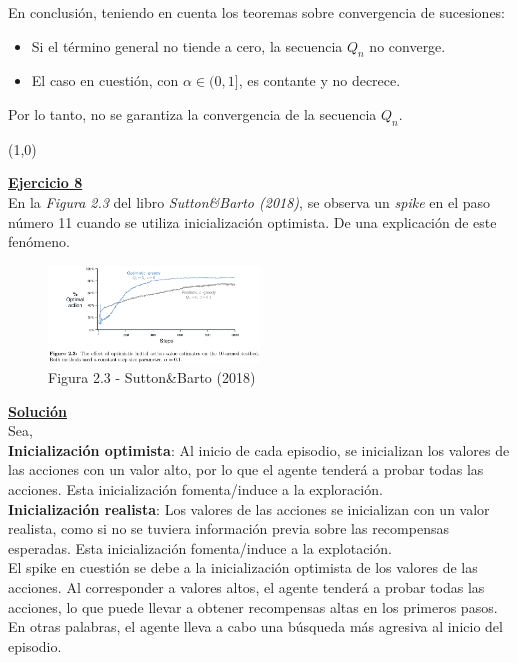 \documentclass[12pt]{article}
\newlength\tindent
\renewcommand{\indent}{\hspace*{\tindent}}
\begin{document}
\begin{itemize}
    En conclusión, teniendo en cuenta los teoremas sobre convergencia de sucesiones:

    \begin{itemize}
        \item Si el término general no tiende a cero, la secuencia $Q_n$ no converge.
        \item El caso en cuestión, con $\alpha \in (0,1]$, es contante y no decrece.
    \end{itemize}

    Por lo tanto, no se garantiza la convergencia de la secuencia $Q_n$.

    \line(1,0){\textwidth}

    \indent\underline{\textbf{Ejercicio 8}}\\
    En la \textit{Figura 2.3} del libro \textit{Sutton\&Barto (2018)}, se observa un \textit{spike} en el paso número 11 cuando se utiliza inicialización optimista.
    De una explicación de este fenómeno.

    \begin{figure}[H]
        \centering
        \includegraphics[width=0.5\textwidth]{../img/Figura2_3_SuttonBarto}
        \caption{Figura 2.3 - Sutton\&Barto (2018)}
        \label{fig:fig_2_3}
    \end{figure}

    \indent\underline{\textbf{Solución}}\\
    Sea,\\
    \textbf{Inicialización optimista}: Al inicio de cada episodio, se inicializan los valores de las acciones con un valor alto, por lo que el agente tenderá a probar todas las acciones.
    Esta inicialización fomenta/induce a la exploración.\\
    \textbf{Inicialización realista}: Los valores de las acciones se inicializan con un valor realista, como si no se tuviera información previa sobre las recompensas esperadas.
    Esta inicialización fomenta/induce a la explotación.\\

    El spike en cuestión se debe a la inicialización optimista de los valores de las acciones.
    Al corresponder a valores altos, el agente tenderá a probar todas las acciones, lo que puede llevar a obtener recompensas altas en los primeros pasos.
    En otras palabras, el agente lleva a cabo una búsqueda más agresiva al inicio del episodio.


\end{itemize}
\end{document}
